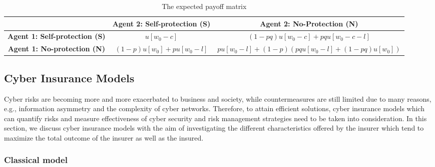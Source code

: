 \documentclass[twocolumn,10pt]{IEEEtran}
\begin{document}
\begin{table*}[t]
	\caption{The expected payoff matrix} %
	\centering %
	\begin{tabular}{|c|c|c|}
		\hline
		&\textbf{Agent 2: Self-protection (S)}&\textbf{Agent 2: No-Protection (N)}\\
		\hline
		\hline
		\textbf{Agent 1: Self-protection (S)} & $u[w_0-c]$ & $(1-pq) u[w_0-c] + pq u[w_0-c-l]$ \\
		\hline
		\textbf{Agent 1: No-protection (N)} & $(1-p) u[w_0] + p u[w_0-l]$ & $p u[w_0-l] + (1-p) (pq u[w_0-l] + (1-pq) u[w_0]) $ \\
		\hline
	\end{tabular}
	\label{tab:expected_payoff}
\end{table*}


\subsection{Cyber Insurance Models}

Cyber risks are becoming more and more exacerbated to business and society, while countermeasures are still limited due to many reasons, e.g., information asymmetry and the complexity of cyber networks. Therefore, to attain efficient solutions, cyber insurance models which can quantify risks and measure effectiveness of cyber security and risk management strategies need to be taken into consideration. In this section, we discuss cyber insurance models with the aim of investigating the different characteristics offered by the insurer which tend to maximize the total outcome of the insurer as well as the insured. 


\subsubsection{Classical model}
\end{document}
